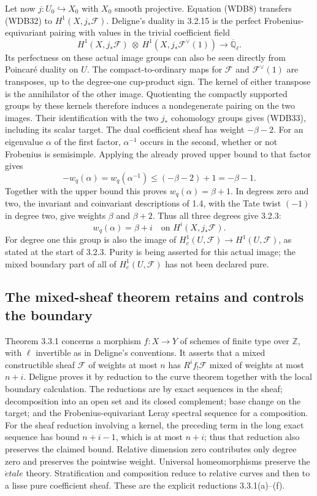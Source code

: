 Let now \(j:U_0\hookrightarrow X_0\) with \(X_0\) smooth
projective. Equation (WDB8) transfers (WDB32) to
\(H^1(X,j_*\mathcal F)\). Deligne's duality in 3.2.15 is the
perfect Frobenius-equivariant pairing with values in the trivial
coefficient field
\[
 H^1(X,j_*\mathcal F)\ \otimes\
 H^1(X,j_*\mathcal F^\vee(1))
 \longrightarrow\overline{\mathbb Q}_\ell.
\tag{WDB33}
\]
Its perfectness on these actual image groups can also be seen
directly from Poincar\'e duality on \(U\). The compact-to-ordinary
maps for \(\mathcal F\) and \(\mathcal F^\vee(1)\) are
transposes, up to the degree-one cup-product sign. The kernel of
either transpose is the annihilator of the other image. Quotienting
the compactly supported groups by these kernels therefore induces
a nondegenerate pairing on the two images. Their identification
with the two \(j_*\) cohomology groups gives (WDB33), including
its scalar target.
The dual coefficient sheaf has weight \(-\beta-2\). For an
eigenvalue \(\alpha\) of the first factor, \(\alpha^{-1}\)
occurs in the second, whether or not Frobenius is semisimple.
Applying the already proved upper bound to that factor gives
\[
 -w_q(\alpha)=w_q(\alpha^{-1})
 \le(-\beta-2)+1=-\beta-1.
 \tag{WDB34}
\]
Together with the upper bound this proves
\(w_q(\alpha)=\beta+1\). In degrees zero and two, the invariant
and coinvariant descriptions of 1.4, with the Tate twist \((-1)\)
in degree two, give weights \(\beta\) and \(\beta+2\).
Thus all three degrees give 3.2.3:
\[
 w_q(\alpha)=\beta+i
 \quad\text{on }H^i(X,j_*\mathcal F).
 \tag{WDB35}
\]
For degree one this group is also the image of
\(H_c^1(U,\mathcal F)\to H^1(U,\mathcal F)\), as stated at
the start of 3.2.3. Purity is being asserted for this actual image;
the mixed boundary part of all of \(H_c^1(U,\mathcal F)\) has
not been declared pure.

\subsection{The mixed-sheaf theorem retains and controls the boundary}

Theorem 3.3.1 concerns a morphism \(f:X\to Y\) of schemes of
finite type over \(\mathbb Z\), with \(\ell\) invertible as
in Deligne's conventions. It asserts that a mixed constructible
sheaf \(\mathcal F\) of weights at most \(n\) has
\(R^if_!\mathcal F\) mixed of weights at most \(n+i\).
Deligne proves it by reduction to the curve theorem together with
the local boundary calculation. The reductions are by exact
sequences in the sheaf; decomposition into an open set and its
closed complement; base change on the target; and the
Frobenius-equivariant Leray spectral sequence for a composition.
For the sheaf reduction involving a kernel, the preceding term in
the long exact sequence has bound \(n+i-1\), which is at most
\(n+i\); thus that reduction also preserves the claimed bound.
Relative dimension zero contributes only degree zero and preserves
the pointwise weight. Universal homeomorphisms preserve the
\(\acute etale\) theory. Stratification and composition reduce
to relative curves and then to a lisse pure coefficient sheaf.
These are the explicit reductions 3.3.1(a)--(f).

